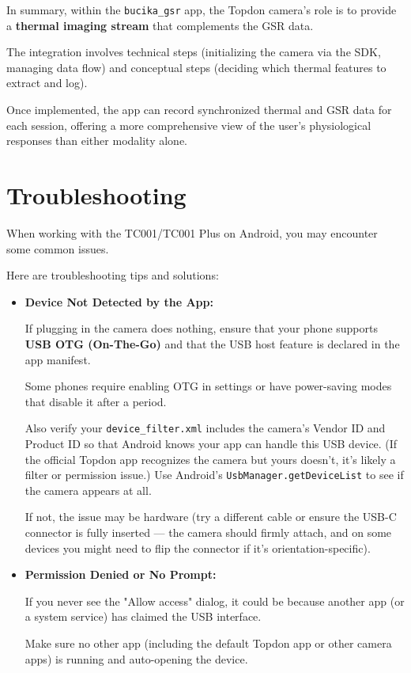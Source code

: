 {In summary, within the \texttt{bucika_gsr} app, the Topdon camera's role is to provide a \textbf{thermal imaging stream}
 that complements the GSR data.

The integration involves technical steps (initializing the camera via the SDK, managing data flow) and conceptual steps (deciding which thermal features to extract and log).

Once implemented, the app can record synchronized thermal and GSR data for each session, offering a more comprehensive view of the user's physiological responses than either modality alone.

\section{Troubleshooting}

When working with the TC001/TC001 Plus on Android, you may encounter some common issues.

Here are troubleshooting tips and solutions: \begin{itemize}
 
\item \textbf{Device Not Detected by the App:}

If plugging in the camera does nothing, ensure that your phone supports \textbf{USB OTG (On-The-Go)}
 and that the USB host feature is declared in the app manifest.

Some phones require enabling OTG in settings or have power-saving modes that disable it after a period.

Also verify your \texttt{device_filter.xml} includes the camera's Vendor ID and Product ID so that Android knows your app can handle this USB device. (If the official Topdon app recognizes the camera but yours doesn't, it's likely a filter or permission issue.) Use Android's \texttt{UsbManager.getDeviceList} to see if the camera appears at all.

If not, the issue may be hardware (try a different cable or ensure the USB-C connector is fully inserted --- the camera should firmly attach, and on some devices you might need to flip the connector if it's orientation-specific).

\item \textbf{Permission Denied or No Prompt:}

If you never see the "Allow access" dialog, it could be because another app (or a system service) has claimed the USB interface.

Make sure no other app (including the default Topdon app or other camera apps) is running and auto-opening the device.


\end{itemize}}
